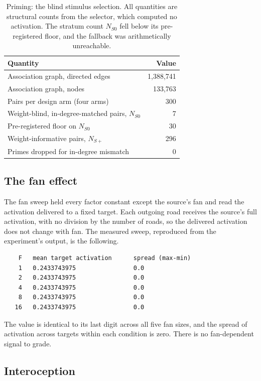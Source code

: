 \documentclass[11pt]{article}
\begin{document}
\begin{table}[t]
  \centering
  \caption{Priming: the blind stimulus selection. All quantities are structural counts from
    the selector, which computed no activation. The stratum count $N_{S0}$ fell below its
    pre-registered floor, and the fallback was arithmetically unreachable.}
  \label{tab:priming}
  \small
  \begin{tabular}{@{}lr@{}}
    \toprule
    Quantity & Value \\
    \midrule
    Association graph, directed edges & 1,388,741 \\
    Association graph, nodes & 133,763 \\
    Pairs per design arm (four arms) & 300 \\
    Weight-blind, in-degree-matched pairs, $N_{S0}$ & 7 \\
    Pre-registered floor on $N_{S0}$ & 30 \\
    Weight-informative pairs, $N_{S+}$ & 296 \\
    Primes dropped for in-degree mismatch & 0 \\
    \bottomrule
  \end{tabular}
\end{table}

\subsection{The fan effect}

The fan sweep held every factor constant except the source's fan and read the activation
delivered to a fixed target. Each outgoing road receives the source's full activation, with
no division by the number of roads, so the delivered activation does not change with fan.
The measured sweep, reproduced from the experiment's output, is the following.

\begin{verbatim}
    F   mean target activation      spread (max-min)
    1   0.2433743975                0.0
    2   0.2433743975                0.0
    4   0.2433743975                0.0
    8   0.2433743975                0.0
   16   0.2433743975                0.0
\end{verbatim}

The value is identical to its last digit across all five fan sizes, and the spread of
activation across targets within each condition is zero. There is no fan-dependent signal
to grade.

\subsection{Interoception}
\end{document}

